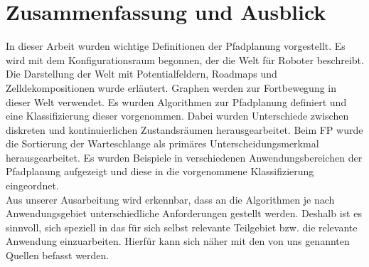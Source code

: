 
\chapter{Zusammenfassung und Ausblick}
In dieser Arbeit wurden wichtige Definitionen der Pfadplanung vorgestellt. Es wird mit dem Konfigurationsraum begonnen, der die Welt für Roboter beschreibt. Die Darstellung der Welt mit Potentialfeldern, Roadmaps und Zelldekompositionen wurde erläutert. Graphen werden zur Fortbewegung in dieser Welt verwendet. Es wurden Algorithmen zur Pfadplanung definiert und eine Klassifizierung dieser vorgenommen. Dabei wurden Unterschiede zwischen diskreten und kontinuierlichen Zustandsräumen herausgearbeitet. Beim FP wurde die Sortierung der Warteschlange als primäres Unterscheidungsmerkmal herausgearbeitet. Es wurden Beispiele in verschiedenen Anwendungsbereichen der Pfadplanung aufgezeigt und diese in die vorgenommene Klassifizierung eingeordnet.\\
Aus unserer Ausarbeitung wird erkennbar, dass an die Algorithmen je nach Anwendungsgebiet unterschiedliche Anforderungen gestellt werden. Deshalb ist es sinnvoll, sich speziell in das für sich selbst relevante Teilgebiet bzw. die relevante Anwendung einzuarbeiten. Hierfür kann sich näher mit den von uns genannten Quellen befasst werden.
